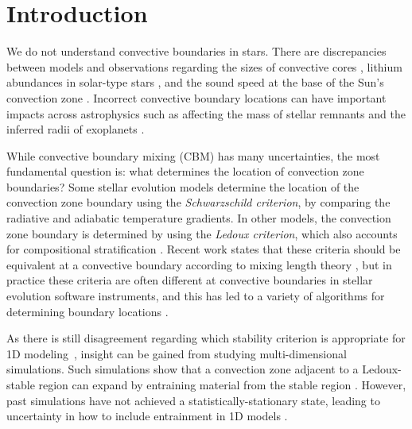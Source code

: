 
\section{Introduction}
\label{sec:introduction}
We do not understand convective boundaries in stars.
There are discrepancies between models and observations regarding the sizes of convective cores \citep{claret_torres_2018, viani_basu_2020, pedersen_etal_2021, johnston_2021}, lithium abundances in solar-type stars \citep{pinsonneault_1997, sestito_randich_2005, carlos_etal_2019, dumont_etal_2021}, and the sound speed at the base of the Sun's convection zone \citep[see][Sec.~7.2.1]{basu_2016}.
Incorrect convective boundary locations can have important impacts across astrophysics such as affecting the mass of stellar remnants \citep{farmer_etal_2019, mehta_etal_2022} and the inferred radii of exoplanets \citep{basu_etal_2012, morrell_2020}.

While convective boundary mixing (CBM) has many uncertainties, the most fundamental question is: what determines the location of convection zone boundaries? 
Some stellar evolution models determine the location of the convection zone boundary using the \emph{Schwarzschild criterion}, by comparing the radiative and adiabatic temperature gradients.
In other models, the convection zone boundary is determined by using the \emph{Ledoux criterion}, which also accounts for compositional stratification \citep[][chapter 3, reviews these criteria]{salaris_cassisi_2017}.
Recent work states that these criteria should be equivalent at a convective boundary according to mixing length theory \citep{gabriel_etal_2014, mesa4, mesa5}, but in practice these criteria are often different at convective boundaries in stellar evolution software instruments, and this has led to a variety of algorithms for determining boundary locations \citep{mesa4,mesa5}.

As there is still disagreement regarding which stability criterion is appropriate for 1D modeling~\citep[see][chapter 2]{kaiser_etal_2020}, insight can be gained from studying multi-dimensional simulations.
Such simulations show that a convection zone adjacent to a Ledoux-stable region can expand by entraining material from the stable region \citep{meakin_arnett_2007, woodward_etal_2015, jones_etal_2017, cristini_etal_2019, fuentes_cumming_2020, andrassy_etal_2020, andrassy_etal_2021}.
However, past simulations have not achieved a statistically-stationary state, leading to uncertainty in how to include entrainment in 1D models \citep{staritsin_2013, scott_etal_2021}.

